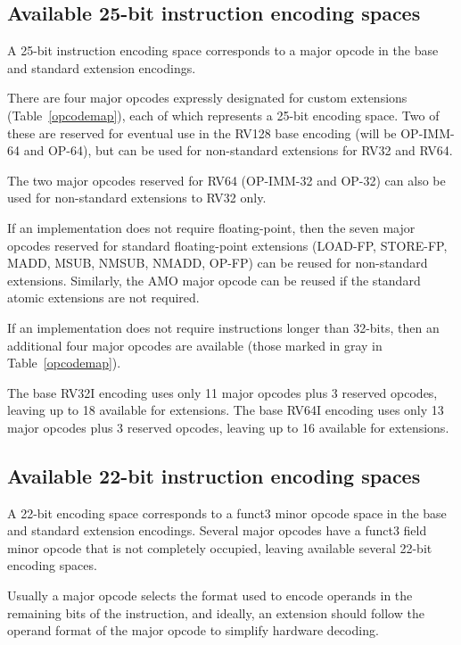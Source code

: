 \subsection*{Available 25-bit instruction encoding spaces}

A 25-bit instruction encoding space corresponds to a major opcode in
the base and standard extension encodings.

There are four major opcodes expressly designated for custom extensions
(Table~\ref{opcodemap}), each of which represents a 25-bit encoding
space.  Two of these are reserved for eventual use in the RV128 base
encoding (will be OP-IMM-64 and OP-64), but can be used for
non-standard extensions for RV32 and RV64.

The two major opcodes reserved for RV64 (OP-IMM-32 and OP-32) can also be
used for non-standard extensions to RV32 only.

If an implementation does not require floating-point, then the seven
major opcodes reserved for standard floating-point extensions
(LOAD-FP, STORE-FP, MADD, MSUB, NMSUB, NMADD, OP-FP) can be reused for
non-standard extensions.  Similarly, the AMO major opcode can be
reused if the standard atomic extensions are not required.

If an implementation does not require instructions longer than
32-bits, then an additional four major opcodes are available (those
marked in gray in Table~\ref{opcodemap}).

The base RV32I encoding uses only 11 major opcodes plus 3 reserved
opcodes, leaving up to 18 available for extensions.  The base RV64I
encoding uses only 13 major opcodes plus 3 reserved opcodes, leaving
up to 16 available for extensions.

\subsection*{Available 22-bit instruction encoding spaces}

A 22-bit encoding space corresponds to a funct3 minor opcode space in
the base and standard extension encodings.  Several major opcodes have
a funct3 field minor opcode that is not completely occupied, leaving
available several 22-bit encoding spaces.

Usually a major opcode selects the format used to encode operands in
the remaining bits of the instruction, and ideally, an extension
should follow the operand format of the major opcode to simplify
hardware decoding.


